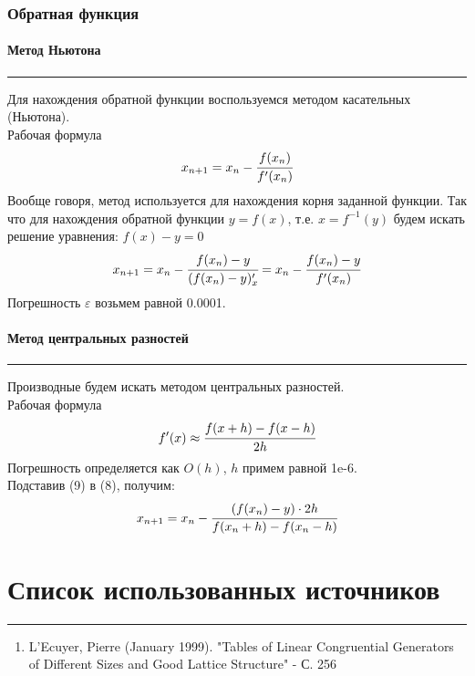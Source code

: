 \documentclass[a4paper, 14pt]{extarticle}
\begin{document}
\subsubsection{Обратная функция}

\paragraph{Метод Ньютона}\vspace{-20pt}\rule{\linewidth}{0.1mm}

Для нахождения обратной функции воспользуемся методом касательных (Ньютона). \\
Рабочая формула
\begin{equation*}
  x_{n+1} = x_n - \cfrac{f(x_n)}{f'(x_n)}
\end{equation*}
Вообще говоря, метод используется для нахождения корня заданной функции. Так что 
для нахождения обратной функции $y = f(x)$, т.е. $x = f^{-1}(y)$ будем искать 
решение уравнения: $f(x) - y = 0$
\begin{equation}
  x_{n+1} = x_n - \cfrac{f(x_n) - y}{(f(x_n) - y)'_x} = 
  x_n - \cfrac{f(x_n) - y}{f'(x_n)}
\end{equation}
Погрешность $\varepsilon$ возьмем равной 0.0001.

\paragraph{Метод центральных разностей}\vspace{-20pt}\rule{\linewidth}{0.1mm}

Производные будем искать методом центральных разностей.\\
Рабочая формула
\begin{equation}
  f'(x) \approx \cfrac{f(x+h) - f(x-h)}{2h}
\end{equation}
Погрешность определяется как $O(h)$, $h$ примем равной 1e-6.\\

Подставив (9) в (8), получим:
\begin{equation}
  x_{n+1} = x_n - \cfrac{(f(x_n) - y) \cdot 2 h}{f(x_n + h) - f(x_n - h)}
\end{equation}


\newpage
\section{Список использованных источников}\vspace{-20pt}\rule{\linewidth}{0.1mm}
\begin{enumerate}
  \item \label{item:source1} L'Ecuyer, Pierre (January 1999). "Tables of Linear Congruential Generators of Different Sizes and Good Lattice Structure" - С. 256
\end{enumerate}
\end{document}
